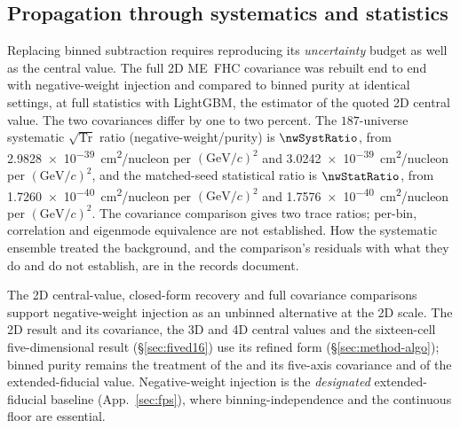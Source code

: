 \subsection{Propagation through systematics and statistics}
\label{sec:negweight-uq}

Replacing binned subtraction requires reproducing its \emph{uncertainty} budget as well as the central value. The full 2D ME~FHC covariance was rebuilt end to end with negative-weight injection and compared to binned purity at identical settings, at full statistics with LightGBM, the estimator of the quoted 2D central value. The two covariances differ by one to two percent. The $187$-universe systematic $\sqrt{\mathrm{Tr}}$ ratio (negative-weight/purity) is $\nwSystRatio$, from \SI{2.9828e-39}{cm^2/nucleon} per $(\mathrm{GeV}/c)^{2}$ and \SI{3.0242e-39}{cm^2/nucleon} per $(\mathrm{GeV}/c)^{2}$, and the matched-seed statistical ratio is $\nwStatRatio$, from \SI{1.7260e-40}{cm^2/nucleon} per $(\mathrm{GeV}/c)^{2}$ and \SI{1.7576e-40}{cm^2/nucleon} per $(\mathrm{GeV}/c)^{2}$. The covariance comparison gives two trace ratios; per-bin, correlation and eigenmode equivalence are not established. How the systematic ensemble treated the background, and the comparison's residuals with what they do and do not establish, are in the records document.

The 2D central-value, closed-form recovery and full covariance comparisons support negative-weight injection as an unbinned alternative at the 2D scale. The 2D result and its covariance, the 3D and 4D central values and the sixteen-cell five-dimensional result (\S\ref{sec:fived16}) use its refined form (\S\ref{sec:method-algo}); binned purity remains the treatment of the \resFiveAxis{} and its five-axis covariance and of the extended-fiducial value. Negative-weight injection is the \emph{designated} extended-fiducial baseline (App.~\ref{sec:fps}), where binning-independence and the continuous floor are essential.

